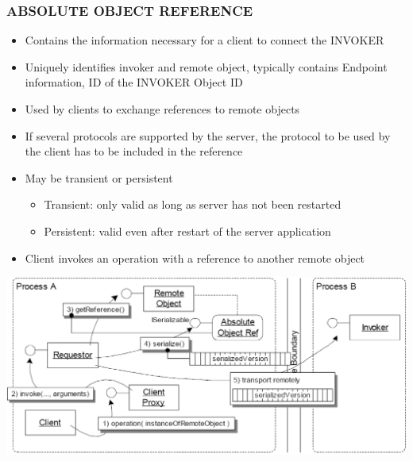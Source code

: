 \documentclass[10pt]{article}
\begin{document}
\subsubsection{ABSOLUTE OBJECT REFERENCE}
\begin{itemize}
	\item Contains the information necessary for a client to connect the INVOKER
	\item Uniquely identifies invoker and remote object, typically contains Endpoint information, ID of the INVOKER Object ID
	\item Used by clients to exchange references to remote objects
	\item If several protocols are supported by the server, the protocol to be used by the client has to be included in the reference
	\item May be transient or persistent
		\begin{itemize}
			\item Transient: only valid as long as server has not been restarted
			\item Persistent: valid even after restart of the server application
		\end{itemize}
	\item Client invokes an operation with a reference to another remote object
\end{itemize}
\begin{center}
	\includegraphics[scale=0.2]{absolute-object-reference.png}
\end{center}
\end{document}
